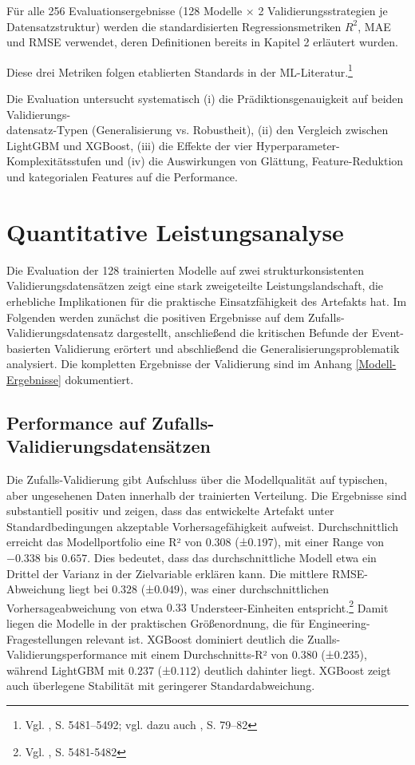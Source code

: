 Für alle 256 Evaluationsergebnisse (128 Modelle × 2 Validierungsstrategien je Datensatzstruktur) werden die standardisierten Regressionsmetriken $R^2$, MAE und RMSE verwendet, deren Definitionen bereits in Kapitel 2 erläutert wurden.

Diese drei Metriken folgen etablierten Standards in der \ac{ML}-Literatur.\footnote{Vgl. \cite{Hodson2022}, S. 5481–5492; vgl. dazu auch \cite{Willmott2005}, S. 79–82}

Die Evaluation untersucht systematisch (i) die Prädiktionsgenauigkeit auf beiden Validierungs-\\datensatz-Typen (Generalisierung vs. Robustheit), (ii) den Vergleich zwischen LightGBM und XGBoost, (iii) die Effekte der vier Hyperparameter-Komplexitätsstufen und (iv) die Auswirkungen von Glättung, Feature-Reduktion und kategorialen Features auf die Performance.


\section{Quantitative Leistungsanalyse}

Die Evaluation der 128 trainierten Modelle auf zwei strukturkonsistenten Validierungsdatensätzen zeigt eine stark zweigeteilte Leistungslandschaft, die erhebliche Implikationen für die praktische Einsatzfähigkeit des Artefakts hat. Im Folgenden werden zunächst die positiven Ergebnisse auf dem Zufalls-Validierungsdatensatz dargestellt, anschließend die kritischen Befunde der Event-basierten Validierung erörtert und abschließend die Generalisierungsproblematik analysiert.
Die kompletten Ergebnisse der Validierung sind im Anhang \ref{Modell-Ergebnisse} dokumentiert.

\subsection{Performance auf Zufalls-Validierungsdatensätzen}

Die Zufalls-Validierung gibt Aufschluss über die Modellqualität auf typischen, aber ungesehenen Daten innerhalb der trainierten Verteilung. Die Ergebnisse sind substantiell positiv und zeigen, dass das entwickelte Artefakt unter Standardbedingungen akzeptable Vorhersagefähigkeit aufweist.
Durchschnittlich erreicht das Modellportfolio eine R² von $0.308$ (±$0.197$), mit einer Range von $-0.338$ bis $0.657$. Dies bedeutet, dass das durchschnittliche Modell etwa ein Drittel der Varianz in der Zielvariable erklären kann. Die mittlere RMSE-Abweichung liegt bei $0.328$ (±$0.049$), was einer durchschnittlichen Vorhersageabweichung von etwa $0.33$ Understeer-Einheiten entspricht.\footnote{Vgl. \cite{Hodson2022}, S. 5481-5482} Damit liegen die Modelle in der praktischen Größenordnung, die für Engineering-Fragestellungen relevant ist. XGBoost dominiert deutlich die Zualls-Validierungsperformance mit einem Durchschnitts-R² von $0.380$ (±$0.235$), während LightGBM mit $0.237$ (±$0.112$) deutlich dahinter liegt. XGBoost zeigt auch überlegene Stabilität mit geringerer Standardabweichung.

